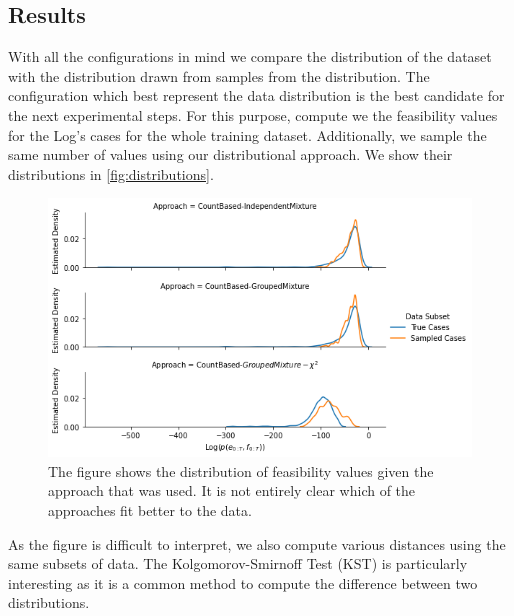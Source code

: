 \documentclass[./../../paper.tex]{subfiles}
\begin{document}
\subsection{Results}
With all the configurations in mind we compare the distribution of the dataset with the distribution drawn from samples from the distribution. The configuration which best represent the data distribution is the best candidate for the next experimental steps. For this purpose, compute we the feasibility values for the Log's cases for the whole training dataset. Additionally, we sample the same number of values using our distributional approach. We show their distributions in \autoref{fig:distributions}.


\begin{figure}
    \centering
    \includegraphics[width=\textwidth]{figures/results/result_distributions.png}
    \caption{The figure shows the distribution of feasibility values given the approach that was used. It is not entirely clear which of the approaches fit better to the data.}
    \label{fig:distributions}
\end{figure}

As the figure is difficult to interpret, we also compute various distances using the same subsets of data. The Kolgomorov-Smirnoff Test (KST) is particularly interesting as it is a common method to compute the difference between two distributions.
\end{document}
